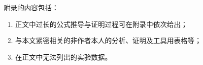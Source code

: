 \begin{appendix}
附录的内容包括：
\begin{enumerate}
\item 正文中过长的公式推导与证明过程可在附录中依次给出；
\item 与本文紧密相关的非作者本人的分析、证明及工具用表格等；
\item 在正文中无法列出的实验数据。
\end{enumerate}
\end{appendix}
    